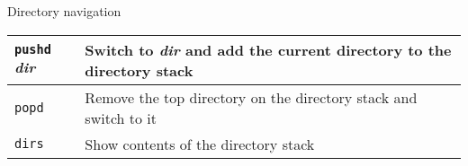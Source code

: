 \begin{block}{Directory navigation}
  \begin{tabu} to 0.9\linewidth { X X }
    \texttt{pushd} \textit{dir} & Switch to \textit{dir} and add the current directory to the directory stack \\ \hline
    \texttt{popd} & Remove the top directory on the directory stack and switch to it \\ \hline
    \texttt{dirs} & Show contents of the directory stack
  \end{tabu}
\end{block}
